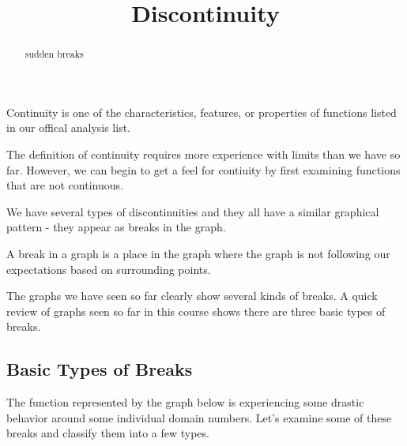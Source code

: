 \documentclass{ximera}
\title{Discontinuity}
\begin{document}
\begin{abstract}
sudden breaks
\end{abstract}
\maketitle



Continuity is one of the characteristics, features, or properties of functions listed in our offical analysis list.

The definition of continuity requires more experience with limits than we have so far. However, we can begin to get a feel for contiuity by first examining functions that are not continuous.

We have several types of discontinuities and they all have a similar graphical pattern - they appear as breaks in the graph.


A break in a graph is a place in the graph where the graph is not following our expectations based on surrounding points.



The graphs we have seen so far clearly show several kinds of breaks.  A quick review of graphs seen so far in this course shows there are three basic types of breaks.









\subsection*{Basic Types of Breaks}

The function represented by the graph below is experiencing some drastic behavior around some individual domain numbers.  Let's examine some of these breaks and classify them into a few types.
\end{document}
